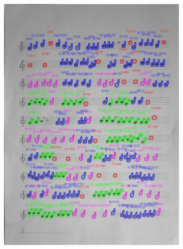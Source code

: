 \documentclass[11pt]{article}
\begin{document}
\begin{figure}[H]
    \centering
    \begin{subfigure}{.45\textwidth}
        \centering
        \graphicspath{ {blobs/} }
        \includegraphics[width=\linewidth]{9_cnts.jpg}
        \label{fig:sub1}
    \end{subfigure}%
    \begin{subfigure}{.45\textwidth}
        \centering
        \graphicspath{ {blobs/} }

\end{subfigure}
\end{figure}
\end{document}
